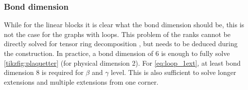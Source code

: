 \subsubsection{Bond dimension}

While for the linear blocks it is clear what the bond dimension should be, this is not the case for the graphs with loops. This problem of the ranks cannot be directly solved for tensor ring decomposition \cite{Zhao2016}, but needs to be deduced during the construction. In practice, a bond dimension of 6 is enough to fully solve \cref{tikzfig:plaquetter} (for physical dimension 2). For \cref{eq:loop_1ext}, at least bond dimension 8 is required for $\beta$ and $\gamma$ level. This is also sufficient to solve longer extensions and multiple extensions from one corner.

